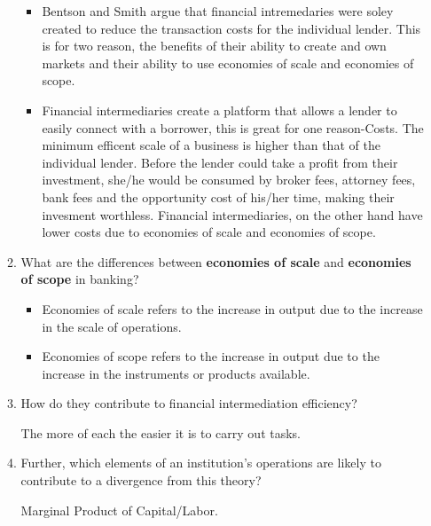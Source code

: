 \begin{enumerate}
\begin{enumerate}
        \begin{itemize}
        
        \item Bentson and Smith argue that financial intremedaries were soley created to reduce the transaction costs for the 
              individual lender. This is for two reason, the benefits of their ability to create and own markets and their ability 
              to use economies of scale and economies of scope.

          \item Financial intermediaries create a platform that allows a lender to easily connect with a borrower, this is great for one reason-Costs. The minimum efficent scale of a business
                is higher than that of the individual lender. Before the lender could take a profit from their investment, she/he would be consumed by broker fees, attorney fees, bank fees and the opportunity cost of his/her
                time, making their invesment worthless. Financial intermediaries, on the other hand have lower costs due to economies of scale and economies of scope.  
        \end{itemize}
      
        \item What are the differences between \textbf{economies of scale} and \textbf{economies of scope} 
        in banking? 

        \begin{itemize}
            \item Economies of scale refers to the increase in output due to the increase in the scale of operations. 
            \item Economies of scope refers to the increase in output due to the increase in the instruments or products available.
        \end{itemize}
        
        \item How do they contribute to financial intermediation efficiency? 

            The more of each the easier it is to carry out tasks. 
            
        \item Further, which elements of an institution’s operations are likely to contribute to a 
        divergence from this theory?

        Marginal Product of Capital/Labor. 
    \end{enumerate}


\end{enumerate}
